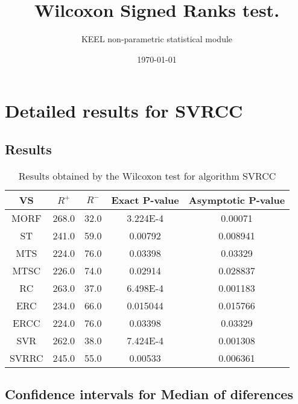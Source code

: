\documentclass[a4paper,10pt]{article}
\title{Wilcoxon Signed Ranks test.}
\date{\today}
\author{KEEL non-parametric statistical module}
\begin{document}
\pagestyle{empty}
\maketitle
\thispagestyle{empty}



\section{Detailed results for SVRCC}


\subsection{Results}

\begin{table}[!htp]
\centering\small
\begin{tabular}{
|c|c|c|c|c|}
\hline
 VS & $R^{+}$ & $R^{-}$ & Exact P-value & Asymptotic P-value \\ \hline 
MORF & 268.0 & 32.0 & 3.224E-4 & 0.00071\\ \hline 
ST & 241.0 & 59.0 & 0.00792 & 0.008941\\ \hline 
MTS & 224.0 & 76.0 & 0.03398 & 0.03329\\ \hline 
MTSC & 226.0 & 74.0 & 0.02914 & 0.028837\\ \hline 
RC & 263.0 & 37.0 & 6.498E-4 & 0.001183\\ \hline 
ERC & 234.0 & 66.0 & 0.015044 & 0.015766\\ \hline 
ERCC & 224.0 & 76.0 & 0.03398 & 0.03329\\ \hline 
SVR & 262.0 & 38.0 & 7.424E-4 & 0.001308\\ \hline 
SVRRC & 245.0 & 55.0 & 0.00533 & 0.006361\\ \hline 

\end{tabular}
\caption{Results obtained by the Wilcoxon test for algorithm SVRCC}
\end{table}

\subsection{Confidence intervals for Median of diferences}
\end{document}
